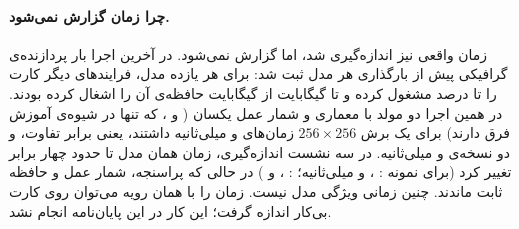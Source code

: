 \paragraph{چرا زمان گزارش نمی‌شود.} زمان واقعی نیز اندازه‌گیری شد، اما گزارش نمی‌شود. در آخرین اجرا بار پردازنده‌ی گرافیکی پیش از بارگذاری هر مدل ثبت شد: برای هر یازده مدل، فرایندهای دیگر کارت را  تا  درصد مشغول کرده و  تا  گیگابایت از  گیگابایت حافظه‌ی آن را اشغال کرده بودند. در همین اجرا دو مولد با معماری و شمار عمل یکسان ( و ، که تنها در شیوه‌ی آموزش فرق دارند) برای یک برش $256\times256$ زمان‌های  و  میلی‌ثانیه داشتند، یعنی  برابر تفاوت، و دو نسخه‌ی   و  میلی‌ثانیه. در سه نشست اندازه‌گیری، زمان همان مدل تا حدود چهار برابر تغییر کرد (برای نمونه : ،  و  میلی‌ثانیه؛ : ،  و ) در حالی که پراسنجه، شمار عمل و حافظه ثابت ماندند. چنین زمانی ویژگی مدل نیست. زمان را با همان رویه می‌توان روی کارت بی‌کار اندازه گرفت؛ این کار در این پایان‌نامه انجام نشد.
